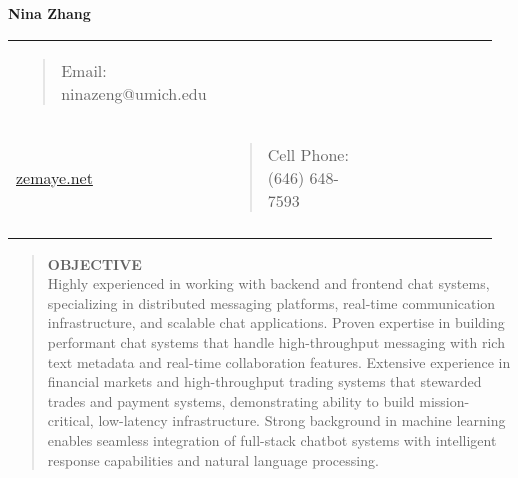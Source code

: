 \documentclass[11pt,a4paper]{article}
\begin{document}
\textbf{Nina Zhang}

\begin{longtable}[]{@{}
  >{\raggedright\arraybackslash}p{0.32\linewidth}
  >{\raggedright\arraybackslash}p{0.32\linewidth}
  >{\raggedright\arraybackslash}p{0.32\linewidth}@{}}
\toprule\noalign{}
\begin{minipage}[b]{\linewidth}\raggedright
\begin{quote}
Email: ninazeng@umich.edu
\end{quote}
\end{minipage} & \begin{minipage}[b]{\linewidth}\centering
\url{github.com/zemaye1}\\
\url{zemaye.net}
\end{minipage} & \begin{minipage}[b]{\linewidth}\raggedright
\begin{quote}
Cell Phone: (646) 648-7593
\end{quote}
\end{minipage} \\
\midrule\noalign{}
\endhead
\bottomrule\noalign{}
\endlastfoot
\end{longtable}

\begin{quote}
\textbf{OBJECTIVE}\\
Highly experienced in working with backend and frontend chat systems, specializing in distributed messaging platforms, real-time communication infrastructure, and scalable chat applications. Proven expertise in building performant chat systems that handle high-throughput messaging with rich text metadata and real-time collaboration features. Extensive experience in financial markets and high-throughput trading systems that stewarded trades and payment systems, demonstrating ability to build mission-critical, low-latency infrastructure. Strong background in machine learning enables seamless integration of full-stack chatbot systems with intelligent response capabilities and natural language processing.
\end{quote}
\end{document}
